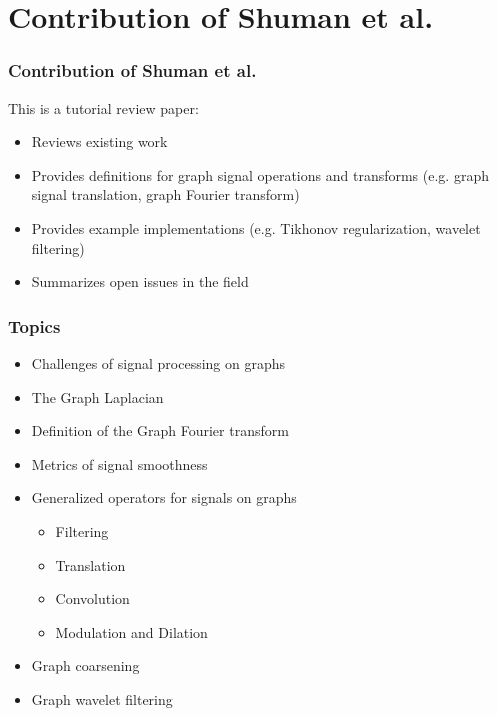 \documentclass{beamer}
\begin{document}
\section{Contribution of Shuman et al.}

\begin{frame}
  \frametitle{Contribution of Shuman et al.}
  This is a tutorial review paper:
  
  \begin{itemize}
  \item Reviews existing work
  \item Provides definitions for graph signal operations and transforms (e.g. graph
    signal translation, graph Fourier transform)
  \item Provides example implementations (e.g. Tikhonov regularization, wavelet filtering)
  \item Summarizes open issues in the field
  \end{itemize}
\end{frame}

\begin{frame}
  \frametitle{Topics}
  \begin{itemize}
  \item Challenges of signal processing on graphs
  \item The Graph Laplacian
  \item Definition of the Graph Fourier transform
  \item Metrics of signal smoothness
  \item Generalized operators for signals on graphs
    \begin{itemize}
    \item Filtering
    \item Translation
    \item Convolution
    \item Modulation and Dilation
    \end{itemize}
  \item Graph coarsening
  \item Graph wavelet filtering
  \end{itemize}
\end{frame}
\end{document}
